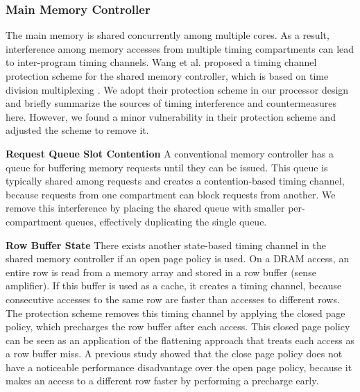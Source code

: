 \subsubsection{Main Memory Controller}

The main memory is shared concurrently among multiple cores. As a result,
interference among memory accesses from multiple timing compartments can lead
to inter-program timing channels. 
Wang et al. proposed a timing channel protection scheme for the shared memory
controller, which is based on time division multiplexing \cite{ushpca14}. We 
adopt their protection scheme in our processor design and briefly summarize the 
sources of timing interference and countermeasures here.
However, we found a minor vulnerability in their protection scheme and
adjusted the scheme to remove it.

\textbf{Request Queue Slot Contention}
A conventional memory controller has a queue for buffering memory requests 
until they can be issued. This queue is typically shared among requests and creates
a contention-based timing channel, because requests from one compartment can 
block requests from another. We remove this interference by placing the shared queue 
with smaller per-compartment queues, effectively duplicating the single queue.

\textbf{Row Buffer State}
There exists another state-based timing channel in the shared memory controller
if an open page policy is used. On a DRAM access, an entire row is read from
a memory array and stored in a row buffer (sense amplifier). If this buffer is
used as a cache, it creates a timing channel, because consecutive accesses to 
the same row are faster than accesses to different rows.
The protection scheme removes this timing channel by applying the closed page
policy, which precharges the row buffer after each access. This
closed page policy can be seen as an application of the flattening approach 
that treats each access as a row buffer miss. A previous study \cite{ushpca14}
showed that the close page policy does not have a noticeable performance
disadvantage over the open page policy, because it makes an access to a different
row faster by performing a precharge early.

